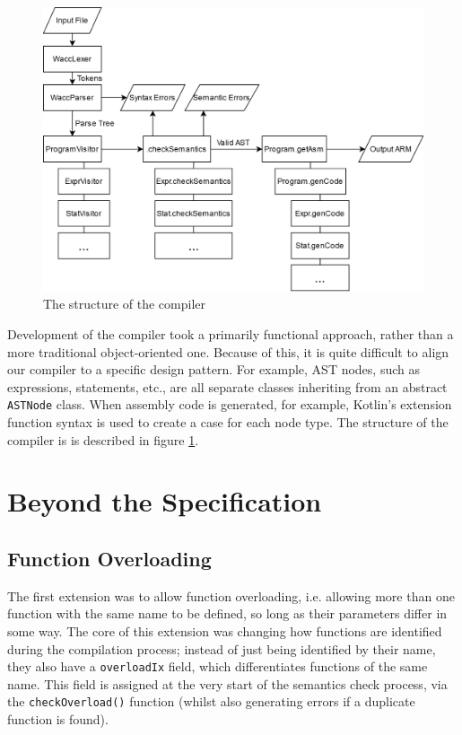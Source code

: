 \documentclass{article}
\begin{document}
\begin{figure}[ht]
\centering
\includegraphics[scale=0.3]{compiler_structure}
\caption{The structure of the compiler}
\label{fig:compiler_structure}
\end{figure}

Development of the compiler took a primarily functional approach, rather than a more traditional object-oriented one. Because of this, it is quite difficult to align our compiler to a specific design pattern. For example, AST nodes, such as expressions, statements, etc., are all separate classes inheriting from an abstract \texttt{ASTNode} class. When assembly code is generated, for example, Kotlin's extension function syntax is used to create a case for each node type. The structure of the compiler is is described in figure \ref{fig:compiler_structure}.


\section{Beyond the Specification}\label{beyond}

\subsection{Function Overloading}

The first extension was to allow function overloading, i.e. allowing more than one function with the same name to be defined, so long as their parameters differ in some way. The core of this extension was changing how functions are identified during the compilation process; instead of just being identified by their name, they also have a \texttt{overloadIx} field, which differentiates functions of the same name. This field is assigned at the very start of the semantics check process, via the \texttt{checkOverload()} function (whilst also generating errors if a duplicate function is found).
\end{document}
